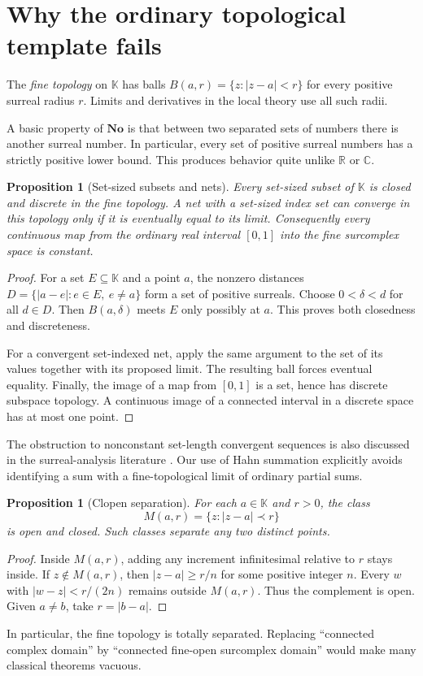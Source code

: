 \documentclass[11pt,a4paper]{article}
\newtheorem{proposition}[theorem]{Proposition}
\theoremstyle{definition}\newtheorem{definition}[theorem]{Definition}
\theoremstyle{remark}\newtheorem{remark}[theorem]{Remark}
\newcommand{\No}{\mathbf{No}}
\newcommand{\K}{\mathbb K}
\newcommand{\C}{\mathbb C}\newcommand{\R}{\mathbb R}\newcommand{\N}{\mathbb N}\newcommand{\Z}{\mathbb Z}
\numberwithin{equation}{section}
\begin{document}
\section{Why the ordinary topological template fails}\label{sec:topology}
The \emph{fine topology} on $\K$ has balls
$B(a,r)=\{z:|z-a|<r\}$ for every positive surreal radius $r$. Limits and derivatives in the local theory use all such radii.

A basic property of $\No$ is that between two separated sets of numbers there is another surreal number. In particular, every set of positive surreal numbers has a strictly positive lower bound. This produces behavior quite unlike $\R$ or $\C$.

\begin{proposition}[Set-sized subsets and nets]\label{prop:setdiscrete}
Every set-sized subset of $\K$ is closed and discrete in the fine topology. A net with a set-sized index set can converge in this topology only if it is eventually equal to its limit. Consequently every continuous map from the ordinary real interval $[0,1]$ into the fine surcomplex space is constant.
\end{proposition}
\begin{proof}
For a set $E\subseteq\K$ and a point $a$, the nonzero distances
$D=\{|a-e|:e\in E,\ e\ne a\}$ form a set of positive surreals. Choose $0<\delta<d$ for all $d\in D$. Then $B(a,\delta)$ meets $E$ only possibly at $a$. This proves both closedness and discreteness.

For a convergent set-indexed net, apply the same argument to the set of its values together with its proposed limit. The resulting ball forces eventual equality. Finally, the image of a map from $[0,1]$ is a set, hence has discrete subspace topology. A continuous image of a connected interval in a discrete space has at most one point.
\end{proof}
The obstruction to nonconstant set-length convergent sequences is also discussed in the surreal-analysis literature \cite{RSS}. Our use of Hahn summation explicitly avoids identifying a sum with a fine-topological limit of ordinary partial sums.

\begin{proposition}[Clopen separation]\label{prop:clopen}
For each $a\in\K$ and $r>0$, the class
\[
 M(a,r)=\{z:|z-a|\prec r\}
\]
is open and closed. Such classes separate any two distinct points.
\end{proposition}
\begin{proof}
Inside $M(a,r)$, adding any increment infinitesimal relative to $r$ stays inside. If $z\notin M(a,r)$, then $|z-a|\geq r/n$ for some positive integer $n$. Every $w$ with $|w-z|<r/(2n)$ remains outside $M(a,r)$. Thus the complement is open. Given $a\ne b$, take $r=|b-a|$.
\end{proof}
In particular, the fine topology is totally separated. Replacing ``connected complex domain'' by ``connected fine-open surcomplex domain'' would make many classical theorems vacuous.
\end{document}
